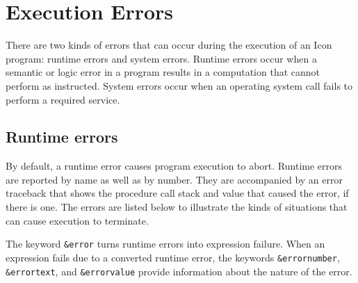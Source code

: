 \section{Execution Errors}

There are two kinds of errors that can occur during the execution of an
Icon program: runtime errors and system errors. Runtime errors occur
when a semantic or logic error in a program results in a computation
that cannot perform as instructed. System errors occur when an
operating system call fails to perform a
required service.

\subsection*{Runtime errors}

By default, a runtime error causes program
execution to abort. Runtime errors are reported by name as well as by
number. They are accompanied by an error traceback that shows the
procedure call stack and value that caused the error, if there is one.
The errors are listed below to illustrate the kinds of situations that
can cause execution to terminate.

The keyword \texttt{\&error} turns runtime errors into
expression failure. When an expression fails due to a converted runtime
error, the keywords \texttt{\&errornumber}, \texttt{\&errortext}, and
\texttt{\&errorvalue} provide information about the nature of the error.

